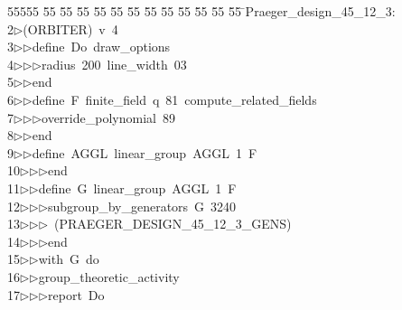 %
%
\begin{tabbing}
55555 \= 55 \= 55 \= 55 \= 55 \= 55 \= 55 \= 55 \= 55 \= 55 \= 55 \= 55 \= 55 \= \>Praeger\_design\_45\_12\_3:\\[0pt]
2\>$\triangleright$\>(ORBITER)\ v\ 4\ \\[0pt]
3\>$\triangleright$\>$\triangleright$\>define\ Do\ draw\_options\ \\[0pt]
4\>$\triangleright$\>$\triangleright$\>$\triangleright$\>radius\ 200\ line\_width\ 03\ \\[0pt]
5\>$\triangleright$\>$\triangleright$\>end\ \\[0pt]
6\>$\triangleright$\>$\triangleright$\>define\ F\ finite\_field\ q\ 81\ compute\_related\_fields\ \\[0pt]
7\>$\triangleright$\>$\triangleright$\>$\triangleright$\>override\_polynomial\ 89\ \\[0pt]
8\>$\triangleright$\>$\triangleright$\>end\ \\[0pt]
9\>$\triangleright$\>$\triangleright$\>define\ AGGL\ linear\_group\ AGGL\ 1\ F\ \\[0pt]
10\>$\triangleright$\>$\triangleright$\>$\triangleright$\>end\ \\[0pt]
11\>$\triangleright$\>$\triangleright$\>define\ G\ linear\_group\ AGGL\ 1\ F\ \\[0pt]
12\>$\triangleright$\>$\triangleright$\>$\triangleright$\>subgroup\_by\_generators\ G\ 3240\ \\[0pt]
13\>$\triangleright$\>$\triangleright$\>$\triangleright$\ (PRAEGER\_DESIGN\_45\_12\_3\_GENS)\ \\[0pt]
14\>$\triangleright$\>$\triangleright$\>$\triangleright$\>end\ \\[0pt]
15\>$\triangleright$\>$\triangleright$\>with\ G\ do\ \\[0pt]
16\>$\triangleright$\>$\triangleright$\>group\_theoretic\_activity\ \\[0pt]
17\>$\triangleright$\>$\triangleright$\>$\triangleright$\>report\ Do\ \\[0pt]

\end{tabbing}
